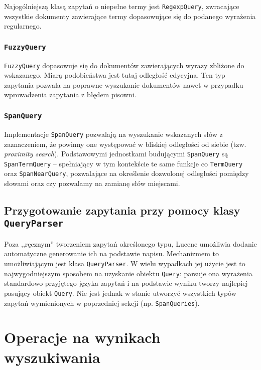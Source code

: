 Najogólniejszą klasą zapytań o niepełne termy jest \texttt{RegexpQuery}, zwracające wszystkie dokumenty zawierające termy dopasowujące się do podanego wyrażenia regularnego.

\subsubsection{\texttt{FuzzyQuery}}

\texttt{FuzzyQuery} dopasowuje się do dokumentów zawierających wyrazy zbliżone do wskazanego. Miarą podobieństwa jest tutaj odległość edycyjna. Ten typ zapytania pozwala na poprawne wyszukanie dokumentów nawet w przypadku wprowadzenia zapytania z błędem pisowni.

\subsubsection{\texttt{SpanQuery}}

Implementacje \texttt{SpanQuery} pozwalają na wyszukanie wskazanych słów z zaznaczeniem, że powinny one występować w bliskiej odległości od siebie (tzw. \emph{proximity search}). Podstawowymi jednostkami budującymi \texttt{SpanQuery} są \texttt{SpanTermQuery} -- spełniający w tym kontekście te same funkcje co \texttt{TermQuery} oraz \texttt{SpanNearQuery}, pozwalające na określenie dozwolonej odległości pomiędzy słowami oraz czy pozwalamy na zamianę słów miejscami.

\subsection{Przygotowanie zapytania przy pomocy klasy \texttt{QueryParser}}

Poza ,,ręcznym'' tworzeniem zapytań określonego typu, Lucene umożliwia dodanie automatyczne generowanie ich na podstawie napisu. Mechanizmem to umożliwiającym jest klasa \texttt{QueryParser}. W wielu wypadkach jej użycie jest to najwygodniejszym sposobem na uzyskanie obiektu \texttt{Query}: parsuje ona wyrażenia standardowo przyjętego języka zapytań i na podstawie wyniku tworzy najlepiej pasujący obiekt \texttt{Query}. Nie jest jednak w stanie utworzyć wszystkich typów zapytań wymienionych w poprzedniej sekcji (np. \texttt{SpanQueries}).

\section{Operacje na wynikach wyszukiwania}

